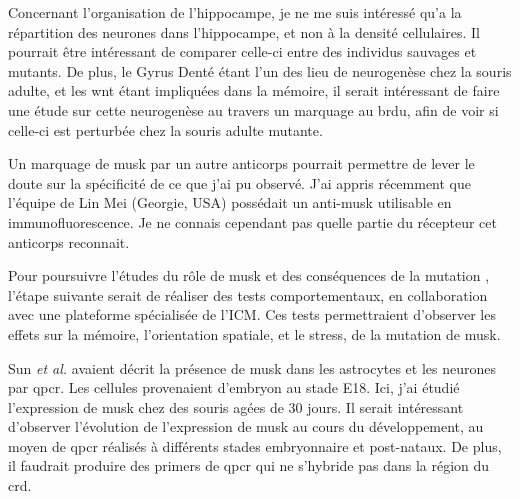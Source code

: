 Concernant l'organisation de l'hippocampe, je ne me suis intéressé qu'a la répartition des neurones dans l'hippocampe, et non à la densité cellulaires. Il pourrait être intéressant de comparer celle-ci entre des individus sauvages et mutants. De plus, le Gyrus Denté étant l'un des lieu de neurogenèse chez la souris adulte, et les \gls{wnt} étant impliquées dans la mémoire, il serait intéressant de faire une étude sur cette neurogenèse au travers un marquage au \gls{brdu}, afin de voir si celle-ci est perturbée chez la souris adulte mutante.

Un marquage de \gls{musk} par un autre anticorps pourrait permettre de lever le doute sur la spécificité de ce que j'ai pu observé. J'ai appris récemment que l'équipe de Lin Mei (Georgie, USA) possédait un anti-\gls{musk} utilisable en immunofluorescence. Je ne connais cependant pas quelle partie du récepteur cet anticorps reconnait.

Pour poursuivre l'études du rôle de \gls{musk} et des conséquences de la mutation \mcrd, l'étape suivante serait de réaliser des tests comportementaux, en collaboration avec une plateforme spécialisée de l'ICM. Ces tests permettraient d'observer les effets sur la mémoire, l'orientation spatiale, et le stress, de la mutation de \gls{musk}.

Sun \emph{et al.} avaient décrit la présence de \gls{musk} dans les astrocytes et les neurones par \gls{qpcr}. Les cellules provenaient d'embryon au stade E18. Ici, j'ai étudié l'expression de \gls{musk} chez des souris agées de 30 jours. Il serait intéressant d'observer l'évolution de l'expression de \gls{musk} au cours du développement, au moyen de \gls{qpcr} réalisés à différents stades embryonnaire et post-nataux. De plus, il faudrait produire des primers de \gls{qpcr} qui ne s'hybride pas dans la région du \gls{crd}. 